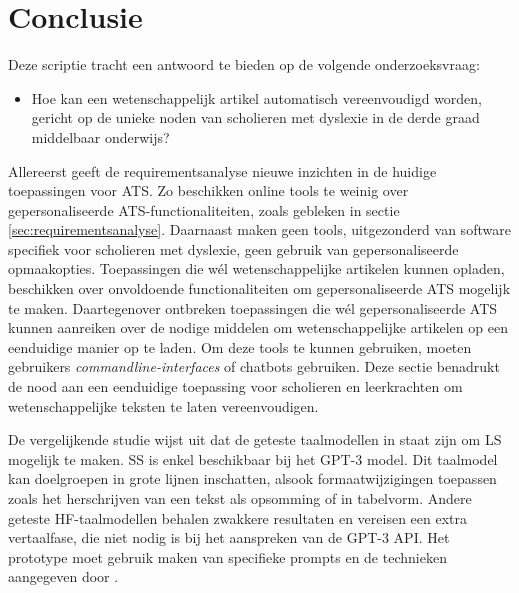 
\chapter{Conclusie}%
\label{ch:conclusie}

Deze scriptie tracht een antwoord te bieden op de volgende onderzoeksvraag:

\begin{itemize}
	\item Hoe kan een wetenschappelijk artikel automatisch vereenvoudigd worden, gericht op de unieke noden van scholieren met dyslexie in de derde graad middelbaar onderwijs?
\end{itemize}

Allereerst geeft de requirementsanalyse nieuwe inzichten in de huidige toepassingen voor ATS. Zo beschikken online tools te weinig over gepersonaliseerde ATS-functionaliteiten, zoals gebleken in sectie \ref{sec:requirementsanalyse}. Daarnaast maken geen tools, uitgezonderd van software specifiek voor scholieren met dyslexie, geen gebruik van gepersonaliseerde opmaakopties. Toepassingen die wél wetenschappelijke artikelen kunnen opladen, beschikken over onvoldoende functionaliteiten om gepersonaliseerde ATS mogelijk te maken. Daartegenover ontbreken toepassingen die wél gepersonaliseerde ATS kunnen aanreiken over de nodige middelen om wetenschappelijke artikelen op een eenduidige manier op te laden. Om deze tools te kunnen gebruiken, moeten gebruikers \textit{commandline-interfaces} of chatbots gebruiken. Deze sectie benadrukt de nood aan een eenduidige toepassing voor scholieren en leerkrachten om wetenschappelijke teksten te laten vereenvoudigen.

\medspace

De vergelijkende studie wijst uit dat de geteste taalmodellen in staat zijn om LS mogelijk te maken. SS is enkel beschikbaar bij het GPT-3 model. Dit taalmodel kan doelgroepen in grote lijnen inschatten, alsook formaatwijzigingen toepassen zoals het herschrijven van een tekst als opsomming of in tabelvorm. Andere geteste HF-taalmodellen behalen zwakkere resultaten en vereisen een extra vertaalfase, die niet nodig is bij het aanspreken van de GPT-3 API. Het prototype moet gebruik maken van specifieke prompts en de technieken aangegeven door \textcite{McFarland2023, White2023}.

